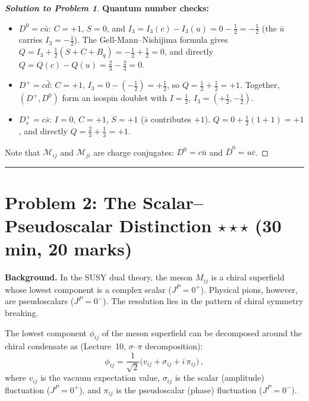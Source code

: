 \documentclass[11pt,a4paper]{article}
\begin{document}
\begin{proof}[\textbf{Solution to Problem 1}]
\textbf{Quantum number checks:}
\begin{itemize}
  \item $D^0 = c\bar{u}$: $C = +1$, $S = 0$, and
    $I_3 = I_3(c) - I_3(u) = 0 - \tfrac{1}{2} = -\tfrac{1}{2}$ (the
    $\bar{u}$ carries $I_3 = -\tfrac{1}{2}$).  The
    Gell-Mann--Nishijima formula gives
    $Q = I_3 + \tfrac{1}{2}(S + C + B_q) = -\tfrac{1}{2} + \tfrac{1}{2}
    = 0$, and directly $Q = Q(c) - Q(u) = \tfrac{2}{3} - \tfrac{2}{3} = 0$.
    \checkmark
  \item $D^+ = c\bar{d}$: $C = +1$, $I_3 = 0 - (-\tfrac{1}{2})
    = +\tfrac{1}{2}$, so $Q = \tfrac{1}{2} + \tfrac{1}{2} = +1$.
    Together, $(D^+, D^0)$ form an isospin doublet with
    $I = \tfrac{1}{2}$, $I_3 = (+\tfrac{1}{2}, -\tfrac{1}{2})$.
    \checkmark
  \item $D_s^+ = c\bar{s}$: $I = 0$, $C = +1$, $S = +1$ ($\bar{s}$
    contributes $+1$).  $Q = 0 + \tfrac{1}{2}(1 + 1) = +1$, and directly
    $Q = \tfrac{2}{3} + \tfrac{1}{3} = +1$.  \checkmark
\end{itemize}

Note that $\mathcal{M}_{ij}$ and $\mathcal{M}_{ji}$ are
charge conjugates: $D^0 = c\bar{u}$ and
$\bar{D}^0 = u\bar{c}$.

\end{proof}


\bigskip
\hrule
\bigskip


\section*{Problem 2: The Scalar--Pseudoscalar Distinction
  \hfill $\star\star\star$ \normalsize(30 min, 20 marks)}
\label{prob:scalar-pseudo}

\noindent\textbf{Background.}
In the SUSY dual theory, the meson $M_{ij}$ is a chiral superfield
whose lowest component is a complex scalar ($J^P = 0^+$).  Physical
pions, however, are pseudoscalars ($J^P = 0^-$).  The resolution
lies in the pattern of chiral symmetry breaking.

The lowest component $\phi_{ij}$ of the meson superfield can be
decomposed around the chiral condensate as (Lecture~10,
$\sigma$--$\pi$ decomposition):
\begin{equation}\label{eq:sigma-pi}
  \phi_{ij} = \frac{1}{\sqrt{2}}
  \bigl(v_{ij} + \sigma_{ij} + i\,\pi_{ij}\bigr)\,,
\end{equation}
where $v_{ij}$ is the vacuum expectation value, $\sigma_{ij}$ is
the scalar (amplitude) fluctuation ($J^P = 0^+$), and $\pi_{ij}$ is
the pseudoscalar (phase) fluctuation ($J^P = 0^-$).
\end{document}
